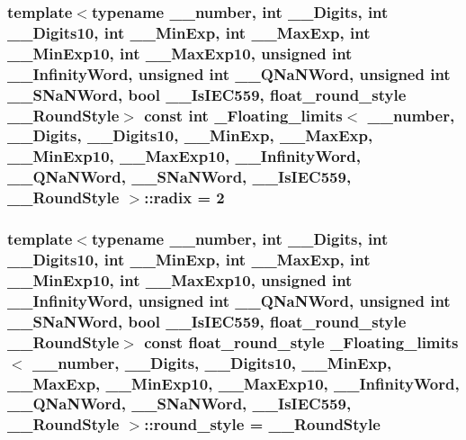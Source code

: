 \subsubsection[{radix}]{\setlength{\rightskip}{0pt plus 5cm}template$<$typename \+\_\+\+\_\+number, int \+\_\+\+\_\+\+Digits, int \+\_\+\+\_\+\+Digits10, int \+\_\+\+\_\+\+Min\+Exp, int \+\_\+\+\_\+\+Max\+Exp, int \+\_\+\+\_\+\+Min\+Exp10, int \+\_\+\+\_\+\+Max\+Exp10, unsigned int \+\_\+\+\_\+\+Infinity\+Word, unsigned int \+\_\+\+\_\+\+Q\+Na\+N\+Word, unsigned int \+\_\+\+\_\+\+S\+Na\+N\+Word, bool \+\_\+\+\_\+\+Is\+I\+E\+C559, float\+\_\+round\+\_\+style \+\_\+\+\_\+\+Round\+Style$>$ const int {\bf \+\_\+\+Floating\+\_\+limits}$<$ \+\_\+\+\_\+number, \+\_\+\+\_\+\+Digits, \+\_\+\+\_\+\+Digits10, \+\_\+\+\_\+\+Min\+Exp, \+\_\+\+\_\+\+Max\+Exp, \+\_\+\+\_\+\+Min\+Exp10, \+\_\+\+\_\+\+Max\+Exp10, \+\_\+\+\_\+\+Infinity\+Word, \+\_\+\+\_\+\+Q\+Na\+N\+Word, \+\_\+\+\_\+\+S\+Na\+N\+Word, \+\_\+\+\_\+\+Is\+I\+E\+C559, \+\_\+\+\_\+\+Round\+Style $>$\+::radix = 2\hspace{0.3cm}{\ttfamily [static]}}\label{class__Floating__limits_aeca7d9a740d59373c6144cf1038af06f}
\hypertarget{class__Floating__limits_afdb0896f9db19d24fb73de6b3b52b515}{}
\subsubsection[{round\+\_\+style}]{\setlength{\rightskip}{0pt plus 5cm}template$<$typename \+\_\+\+\_\+number, int \+\_\+\+\_\+\+Digits, int \+\_\+\+\_\+\+Digits10, int \+\_\+\+\_\+\+Min\+Exp, int \+\_\+\+\_\+\+Max\+Exp, int \+\_\+\+\_\+\+Min\+Exp10, int \+\_\+\+\_\+\+Max\+Exp10, unsigned int \+\_\+\+\_\+\+Infinity\+Word, unsigned int \+\_\+\+\_\+\+Q\+Na\+N\+Word, unsigned int \+\_\+\+\_\+\+S\+Na\+N\+Word, bool \+\_\+\+\_\+\+Is\+I\+E\+C559, float\+\_\+round\+\_\+style \+\_\+\+\_\+\+Round\+Style$>$ const {\bf float\+\_\+round\+\_\+style} {\bf \+\_\+\+Floating\+\_\+limits}$<$ \+\_\+\+\_\+number, \+\_\+\+\_\+\+Digits, \+\_\+\+\_\+\+Digits10, \+\_\+\+\_\+\+Min\+Exp, \+\_\+\+\_\+\+Max\+Exp, \+\_\+\+\_\+\+Min\+Exp10, \+\_\+\+\_\+\+Max\+Exp10, \+\_\+\+\_\+\+Infinity\+Word, \+\_\+\+\_\+\+Q\+Na\+N\+Word, \+\_\+\+\_\+\+S\+Na\+N\+Word, \+\_\+\+\_\+\+Is\+I\+E\+C559, \+\_\+\+\_\+\+Round\+Style $>$\+::round\+\_\+style = \+\_\+\+\_\+\+Round\+Style\hspace{0.3cm}{\ttfamily [static]}}\label{class__Floating__limits_afdb0896f9db19d24fb73de6b3b52b515}
\hypertarget{class__Floating__limits_a92da64b8c5933b8aea8d342ce6896db8}{}
